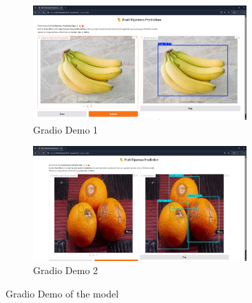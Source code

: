 {\begin{figure}[!htpb]
    \centering
    \begin{subfigure}{0.45\textwidth}
        \centering
        \includegraphics[width=0.9\textwidth]{Figures/gradio_demo_1.png}
        \caption{Gradio Demo 1}
        \label{fig:figure-12.1}
    \end{subfigure}
    \hspace{.5cm} %
    \begin{subfigure}{0.45\textwidth}
        \centering
        \includegraphics[width=0.9\textwidth]{Figures/gradio_demo_2.png}
        \caption{Gradio Demo 2}
        \label{fig:figure-12.2}
    \end{subfigure}
    \caption{Gradio Demo of the model}
    \label{fig:figure-12}
\end{figure}



}